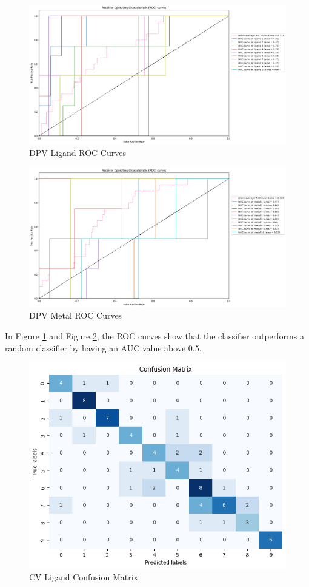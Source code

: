 \begin{figure}[h!]
  \centering
    \includegraphics[width=1.0\textwidth]{figures/dpv_ligand_roc.png}
    \caption{DPV Ligand ROC Curves}
    \label{dpv_ligand_roc}
\end{figure}
\begin{figure}[h!]
  \centering
    \includegraphics[width=1.0\textwidth]{figures/dpv_metal_roc.png}
    \caption{DPV Metal ROC Curves}
    \label{dpv_metal_roc}
\end{figure}
In Figure \ref{dpv_ligand_roc} and Figure \ref{dpv_metal_roc}, the ROC curves show that the classifier outperforms a random classifier by having an AUC value above 0.5. 
\begin{figure}[h!]
  \centering
    \includegraphics[width=1.0\textwidth]{figures/cv_ligand_matrix.png}
    \caption{CV Ligand Confusion Matrix}
    \label{cv_ligand_matrix}
\end{figure}
